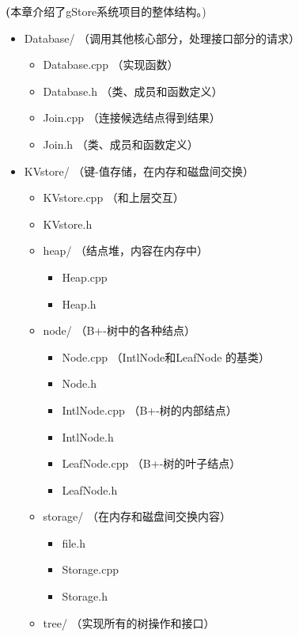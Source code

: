 \documentclass[titlepage, a4paper, 12pt]{article}
\begin{document}
\textbf(本章介绍了gStore系统项目的整体结构。)


\begin{itemize}
	\item
	Database/ （调用其他核心部分，处理接口部分的请求）
	
	\begin{itemize}
		\item
		Database.cpp （实现函数）
		\item
		Database.h （类、成员和函数定义）
		\item
		Join.cpp （连接候选结点得到结果）
		\item
		Join.h （类、成员和函数定义）
	\end{itemize}
	\item
	KVstore/ （键-值存储，在内存和磁盘间交换）
	
	\begin{itemize}
		\item
		KVstore.cpp （和上层交互）
		\item
		KVstore.h
		\item
		heap/ （结点堆，内容在内存中）
		
		\begin{itemize}
			\item
			Heap.cpp
			\item
			Heap.h
		\end{itemize}
		\item
		node/ （B+-树中的各种结点）
		
		\begin{itemize}
			\item
			Node.cpp （IntlNode和LeafNode 的基类）
			\item
			Node.h
			\item
			IntlNode.cpp （B+-树的内部结点）
			\item
			IntlNode.h
			\item
			LeafNode.cpp （B+-树的叶子结点）
			\item
			LeafNode.h
		\end{itemize}
		\item
		storage/ （在内存和磁盘间交换内容）
		
		\begin{itemize}
			\item
			file.h
			\item
			Storage.cpp
			\item
			Storage.h
		\end{itemize}
		\item
		tree/ （实现所有的树操作和接口）
		

\end{itemize}
\end{itemize}
\end{document}
